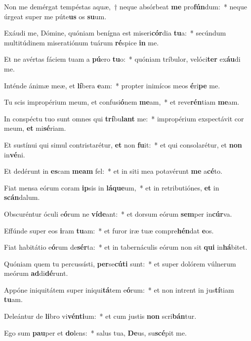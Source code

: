 \item Non me demérgat tempéstas aquæ,~† neque absórbeat \textbf{me} pro\textbf{fún}dum:~* neque úrgeat super me púte\textbf{us} os \textbf{su}um.
\item Exáudi me, Dómine, quóniam benígna est miseri\textbf{cór}dia \textbf{tu}a:~* secúndum multitúdinem miseratiónum tuárum \textbf{ré}spice \textbf{in} me.
\item Et ne avértas fáciem tuam a \textbf{pú}ero \textbf{tu}o:~* quóniam tríbulor, velóci\textbf{ter} ex\textbf{áu}di me.
\item Inténde ánimæ meæ, et \textbf{lí}bera \textbf{e}am:~* propter inimícos meos \textbf{é}ri\textbf{pe} me.
\item Tu scis impropérium meum, et confusi\textbf{ó}nem \textbf{me}am,~* et reve\textbf{rén}tiam \textbf{me}am.
\item In conspéctu tuo sunt omnes qui \textbf{trí}bu\textbf{lant} me:~* impropérium exspectávit cor meum, \textbf{et} mi\textbf{sé}riam.
\item Et sustínui qui simul contristarétur, \textbf{et} non \textbf{fu}it:~* et qui consolarétur, et \textbf{non} in\textbf{vé}ni.
\item Et dedérunt in \textbf{es}cam \textbf{me}\textbf{am} fel:~* et in siti mea potavérunt \textbf{me} a\textbf{cé}to.
\item Fiat mensa eórum coram \textbf{ip}sis in \textbf{lá}\textbf{que}um,~* et in retributiónes, \textbf{et} in \textbf{scán}dalum.
\item Obscuréntur óculi e\textbf{ó}rum ne \textbf{ví}\textbf{de}ant:~* et dorsum eórum \textbf{sem}per in\textbf{cúr}va.
\item Effúnde super eos \textbf{i}ram \textbf{tu}am:~* et furor iræ tuæ compre\textbf{hén}dat \textbf{e}os.
\item Fiat habitátio e\textbf{ó}rum de\textbf{sér}ta:~* et in tabernáculis eórum non sit \textbf{qui} in\textbf{há}bitet.
\item Quóniam quem tu percussísti, \textbf{per}se\textbf{cú}\textbf{ti} sunt:~* et super dolórem vúlnerum meórum \textbf{ad}di\textbf{dé}runt.
\item Appóne iniquitátem super iniqui\textbf{tá}tem e\textbf{ó}rum:~* et non intrent in jus\textbf{tí}tiam \textbf{tu}am.
\item Deleántur de \textbf{li}bro vi\textbf{vén}\textbf{ti}um:~* et cum justis \textbf{non} scri\textbf{bán}tur.
\item Ego sum \textbf{pau}per et \textbf{do}lens:~* salus tua, \textbf{De}us, su\textbf{scé}pit me.

